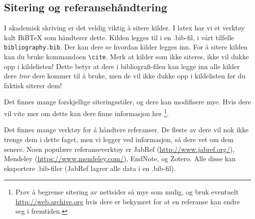 \subsection{Sitering og referansehåndtering}
I akademisk skriving er det veldig viktig å sitere kilder. I latex har vi et verktøy kalt BiBTeX som 
håndterer dette. Kilden legges til i en .bib-fil, i vårt tilfelle \texttt{bibliography.bib}. Der kan dere
se hvordan kilder legges inn. For å sitere kilden kan du bruke kommandoen \texttt{\textbackslash{cite}}.
Merk at kilder som ikke siteres, ikke vil dukke opp i kildelisten! Dette betyr at dere i bibliografi-filen kan
legge inn alle kilder dere \emph{tror} dere kommer til å bruke, men de vil ikke dukke opp i kildelisten før du
faktisk siterer dem!

Det finnes mange forskjellige siteringsstiler, og dere kan modifisere mye. Hvis dere vil vite mer om dette
kan dere finne informasjon her \cite{BiberBibtexEtc,WikibookLatex}\footnote{Prøv å begrense sitering av 
nettsider så mye som mulig, og bruk eventuelt \url{http://web.archive.org} hvis dere er bekymret for at en 
referanse kan endre seg i fremtiden.}.

Det finnes mange verktøy for å håndtere referanser. 
De fleste av dere vil nok ikke trenge dem i dette faget, men vi legger ved informasjon, så dere vet om dem 
senere. Noen populære referanseverktøy er JabRef (\url{http://www.jabref.org/}), Mendeley (\url{https://www.mendeley.com/}), EndNote, og Zotero. Alle disse kan eksportere .bib-filer (JabRef lagrer alle
data i en .bib-fil).

